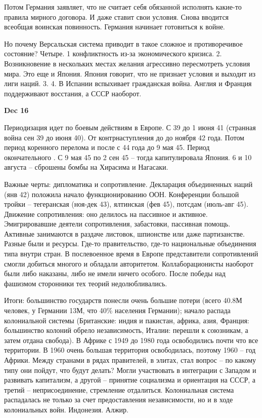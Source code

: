 \documentclass[a4paper, 12pt]{article}
\def\dateis#1{\vspace{\baselineskip}\hfill\textbf{#1}\par}
\begin{document}
\begin{multicols}{2}
Потом Германия заявляет, что не считает себя обязанной исполнять какие-то правила мирного договора. И даже ставит свои условия. Снова вводится всеобщая воинская повинность. Германия начинает готовиться к войне. 

Но почему Версальская система приводит в такое сложное и противоречивое состояние? Четыре. 1 конфликтность из-за экономического кризиса. 2. Возникновение в нескольких местах желания агрессивно пересмотреть условия мира. Это еще и Япония. Япония говорит, что не признает условия и выходит из лиги наций. 3. 4. В Испании вспыхивает гражданская война. Англия и Франция поддерживают восстания, а СССР наоборот. 


\dateis{Dec 16}

Периодизация идет по боевым действиям в Европе. С 39 до 1 июня 41 (странная война сен 39 до июня 40). От контрнаступления до до ноября 42 года. Потом период коренного перелома и после с 44 года до 9 мая 45. Период окончательного . С 9 мая 45 по 2 сен 45 -- тогда капитулировала Япония. 6 и 10 августа -- сброшены бомбы на Хирасима и Нагасаки. 

Важные черты: дипломатика и сопротивление. Декларация объединенных наций (янв 42) положила начало функционированию ООН. Конференции большой тройки -- тегеранская (ноя-дек 43), ялтинская (фев 45), потсдам (июль-авг 45). Движение сопротивления: оно делилось на пассивное и активное. Эмигрировавшие деятели сопротивления, забастовки, пассивная помощь. Активные занимаются в раздаче листовок, шпионстве или даже партизанстве. Разные были и ресурсы. Где-то правительство, где-то национальные объединения типа внутри стран. В послевоенное время в Европе представители сопротивлений смогли добиться многого и обладали авторитетом. Коллаборационисты наоборот были либо наказаны, либо не имели ничего особого. После победы над фашизмом сторонники тех теорий недолюбливались.

Итоги: большинство государств понесли очень большие потери (всего 40.8М человек, у Германии 13М, что 40\% населения Германии); начало распада колониальной системы (Британские: индия и пакистан, африка, азия, Франция: большинство колоний обрело независимость, Италии: перешли к союзникам, а затем отдана свобода). В Африке с 1949 до 1980 года освободились почти что все территории. В 1960 очень большая территория освободилась, поэтому 1960 -- год Африки. Между странами в рядах правителей, в элитах, стал вопрос -- по какому типу они пойдут, что будут делать? Могли участвовать в интеграции с Западом и развивать капитализм, а другой -- принятие социализма и ориентация на СССР, а третий -- неприсоединение, стремление отдалиться. Колониальная система распадалась не только за счет предоставления независимости, но и в ходе колониальных войн. Индонезия. Алжир. 


\end{multicols}
\end{document}

